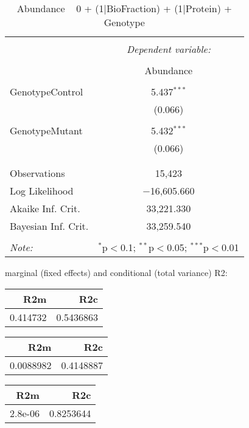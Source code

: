 \documentclass[11pt]{report}
\begin{document}
\begin{table}[!htbp] \centering 
  \caption{Abundance ~ 0 + (1|BioFraction) + (1|Protein) + Genotype} 
  \label{} 
\begin{tabular}{@{\extracolsep{5pt}}lc} 
\\[-1.8ex]\hline 
\hline \\[-1.8ex] 
 & \multicolumn{1}{c}{\textit{Dependent variable:}} \\ 
\cline{2-2} 
\\[-1.8ex] & Abundance \\ 
\hline \\[-1.8ex] 
 GenotypeControl & 5.437$^{***}$ \\ 
  & (0.066) \\ 
  & \\ 
 GenotypeMutant & 5.432$^{***}$ \\ 
  & (0.066) \\ 
  & \\ 
\hline \\[-1.8ex] 
Observations & 15,423 \\ 
Log Likelihood & $-$16,605.660 \\ 
Akaike Inf. Crit. & 33,221.330 \\ 
Bayesian Inf. Crit. & 33,259.540 \\ 
\hline 
\hline \\[-1.8ex] 
\textit{Note:}  & \multicolumn{1}{r}{$^{*}$p$<$0.1; $^{**}$p$<$0.05; $^{***}$p$<$0.01} \\ 
\end{tabular} 
\end{table} 
marginal (fixed effects) and conditional (total variance) R2:

\begin{tabular}{r|r}
\hline
R2m & R2c\\
\hline
0.414732 & 0.5436863\\
\hline
\end{tabular}

\begin{tabular}{r|r}
\hline
R2m & R2c\\
\hline
0.0088982 & 0.4148887\\
\hline
\end{tabular}

\begin{tabular}{r|r}
\hline
R2m & R2c\\
\hline
2.8e-06 & 0.8253644\\
\hline
\end{tabular}
\end{document}
